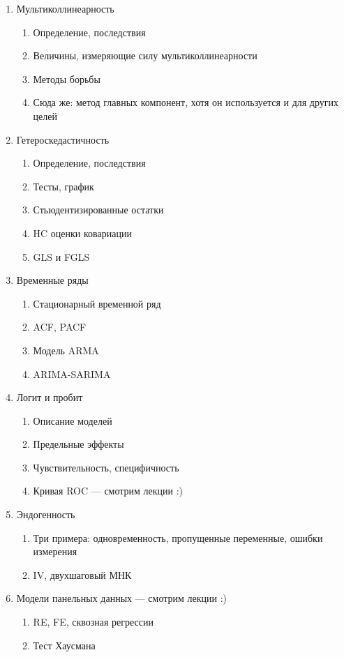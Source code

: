 \documentclass[12pt, a4paper]{article}\usepackage[]{graphicx}\usepackage[]{color}
\begin{document}
\begin{enumerate}
\item Мультиколлинеарность
\begin{enumerate}
\item Определение, последствия
\item Величины, измеряющие силу мультиколлинеарности
\item Методы борьбы
\item Сюда же: метод главных компонент, хотя он используется и для других целей
\end{enumerate}


\item Гетероскедастичность
\begin{enumerate}
\item Определение, последствия
\item Тесты, график
\item Стьюдентизированные остатки
\item HC оценки ковариации
\item GLS и FGLS
\end{enumerate}

\item Временные ряды
\begin{enumerate}
\item Стационарный временной ряд
\item ACF, PACF
\item Модель ARMA
\item ARIMA-SARIMA
\end{enumerate}


\item Логит и пробит
\begin{enumerate}
\item Описание моделей
\item Предельные эффекты
\item Чувствительность, специфичность
\item Кривая ROC — смотрим лекции :)
\end{enumerate}

\item Эндогенность
\begin{enumerate}
\item Три примера: одновременность, пропущенные переменные, ошибки измерения
\item IV, двухшаговый МНК
\end{enumerate}


\item Модели панельных данных — смотрим лекции :)
\begin{enumerate}
\item  RE, FE, сквозная регрессии
\item  Тест Хаусмана
\end{enumerate}


\end{enumerate}
\end{document}

